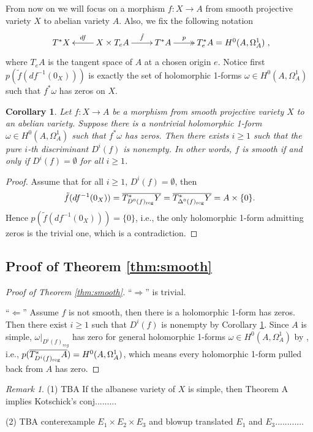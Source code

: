 \documentclass[a4paper,12pt,reqno]{amsart}
\theoremstyle{plain}
\newtheorem{corollary}[theorem]{Corollary}
\theoremstyle{remark}
\newtheorem{remark}[theorem]{Remark}
\begin{document}
From now on we will focus on a morphism $f: X\to A$ from smooth projective variety $X$ to abelian variety $A$. Also, we fix the following notation
$$\xymatrix{
T^*X
& X\times T_eA \ar[l]_-{df} \ar[r]^-{\tilde{f}} &T^*A\ar@{->>}[r]^-p& T^*_e A=H^0(A, \Omega_A^1)
},$$ where $T_eA$ is the tangent space of $A$ at a chosen origin $e$. Notice first $p(\tilde{f}(df^{-1}(0_X)))$ is exactly the set of holomorphic 1-forms $\omega\in H^0(A, \Omega_A^1)$ such that $f^*\omega$ has zeros on $X$.

\begin{corollary}\label{Cor:MiShCor}
Let $f: X\to A$ be a morphism from smooth projective variety $X$ to an abelian variety. Suppose there is a nontrivial holomorphic 1-form $\omega\in H^0(A, \Omega_A^1)$ such that $f^*\omega$ has zeros. Then there exists $i\geq1$ such that the pure $i$-th discriminant $D^i(f)$ is nonempty. In other words, $f$ is smooth if and only if $D^i(f)=\emptyset$ for all $i\geq 1$.
\end{corollary}

\begin{proof}
Assume that for all $i\geq 1$, $D^i(f)=\emptyset$, then $$\tilde{f}(df^{-1}(0_X))=\overline{T^*_{D^0(f)_{\textnormal{reg}}}Y}=\overline{T^*_{\Delta^0(f)_{\textnormal{reg}}}Y}=A\times \{0\}.$$ Hence $p(\tilde{f}(df^{-1}(0_X)))=\{0\}$, i.e., the only holomorphic 1-form admitting zeros is the trivial one, which is a contradiction.
\end{proof}



\subsection{Proof of Theorem \ref{thm:smooth}}

\begin{proof}[Proof of Theorem \ref{thm:smooth}]
``$\Rightarrow$'' is trivial.

``$\Leftarrow$'' Assume $f$ is not smooth, then there is a holomorphic 1-form has zeros. Then there exist $i\geq 1$ such that $D^i(f)$ is nonempty by Corollary \ref{Cor:MiShCor}. Since $A$ is simple, $\omega|_{D^i(f)_{reg}}$ has zero for general holomorphic 1-forms $\omega\in H^0(A, \Omega_A^1)$ by \cite[Proposition 3.1]{HK05}, i.e.,  $p(\overline{T^*_{D^i(f)_{\textnormal{reg}}}A})=H^0(A, \Omega_A^1)$, which means every holomorphic 1-form pulled back from $A$ has zero.
\end{proof}


\begin{remark}
(1) {\color{red}TBA If the albanese variety of $X$ is simple, then Theorem A implies Kotschick's conj.........}

(2) {\color{red} TBA conterexample $E_1\times E_2\times E_3$ and blowup translated $E_1$ and $E_3$............}
\end{remark}
\end{document}
